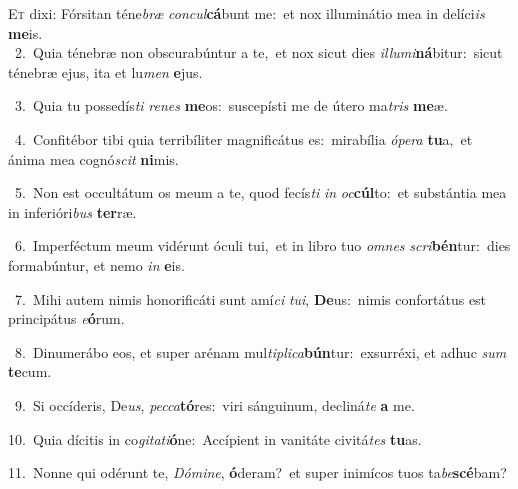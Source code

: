 \lettrine{\initial\textcolor{\initialcolor}{E}}{t} dixi: Fórsitan téne\textit{bræ} \textit{con}\-\textit{cul}\textbf{cá}bunt me:~\star et nox illuminátio mea in delíci\textit{is} \textbf{me}\-is.\\
{\numbfont\textcolor{\numbcolor}{~2.}}~Quia ténebræ non obscurabúntur a te,~\dagger et nox sicut dies \textit{il}\-\textit{lu}\textit{mi}\textbf{ná}bitur:~\star sicut ténebræ ejus, ita et lu\textit{men} \textbf{e}\-jus.\par
{\numbfont\textcolor{\numbcolor}{~3.}}~Quia tu possedís\textit{ti} \textit{re}\-\textit{nes} \textbf{me}\-os:~\star suscepísti me de útero ma\textit{tris} \textbf{me}\-æ.\par
{\numbfont\textcolor{\numbcolor}{~4.}}~Confitébor tibi quia terribíliter magnificátus es:~\dagger mirabília \textit{ó}\-\textit{pe}\textit{ra} \textbf{tu}\-a,~\star et ánima mea cognó\textit{scit} \textbf{ni}\-mis.\par
{\numbfont\textcolor{\numbcolor}{~5.}}~Non est occultátum os meum a te, quod fecís\textit{ti} \textit{in} \textit{oc}\-\textbf{cúl}to:~\star et substántia mea in inferióri\textit{bus} \textbf{ter}\-ræ.\par
{\numbfont\textcolor{\numbcolor}{~6.}}~Imperféctum meum vidérunt óculi tui,~\dagger et in libro tuo \textit{om}\-\textit{nes} \textit{scri}\-\textbf{bén}tur:~\star dies formabúntur, et nemo \textit{in} \textbf{e}\-is.\par
{\numbfont\textcolor{\numbcolor}{~7.}}~Mihi autem nimis honorificáti sunt amí\textit{ci} \textit{tu}\-\textit{i}, \textbf{De}\-us:~\star nimis confortátus est principátus \textit{e}\-\textbf{ó}rum.\par
{\numbfont\textcolor{\numbcolor}{~8.}}~Dinumerábo eos, et super arénam mul\-\textit{ti}\-\textit{pli}\textit{ca}\textbf{bún}tur:~\star exsurréxi, et adhuc \textit{sum} \textbf{te}\-cum.\par
{\numbfont\textcolor{\numbcolor}{~9.}}~Si occíderis, De\-\textit{us}\-, \textit{pec}\-\textit{ca}\textbf{tó}res:~\star viri sánguinum, decliná\textit{te} \textbf{a} me.\par
{\numbfont\textcolor{\numbcolor}{10.}}~Quia dícitis in co\-\textit{gi}\-\textit{ta}\textit{ti}\textbf{ó}ne:~\star Accípient in vanitáte civitá\textit{tes} \textbf{tu}\-as.\par
{\numbfont\textcolor{\numbcolor}{11.}}~Nonne qui odérunt te, \textit{Dó}\-\textit{mi}\textit{ne}, \textbf{ó}\-deram?~\star et super inimícos tuos ta\-\textit{be}\-\textbf{scé}bam?\par
